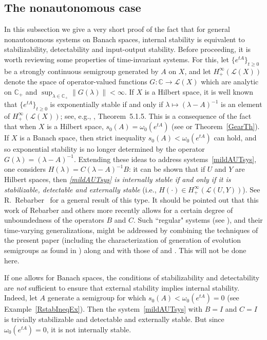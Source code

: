 \documentclass[10pt,psamsfonts,leqno]{siamltex}
\newcommand{\bbC}{\mathbb{C}}
\begin{document}
\subsection{The nonautonomous case} In this subsection we give a very
short
proof of the fact that for general nonautonomous systems on Banach
spaces,
internal stability is equivalent to stabilizability, detectability and
input-output stability.  Before proceeding, it is worth reviewing some
properties of time-invariant systems.  For this, let
$\{e^{tA}\}_{t\ge0}$ be a
strongly continuous semigroup generated by $A$ on $X$, and let
$H_+^\infty(\mathcal{L}(X))$ denote the space of operator-valued
functions $G:\bbC\to\mathcal{L}(X)$ which are analytic on $\bbC_+$ and
$\sup_{\lambda\in\bbC_+}\|G(\lambda)\|<\infty$.    If $X$ is a
Hilbert space, it is well known that $\{e^{tA}\}_{t\ge0}$ is
exponentially stable if and only if $\lambda\mapsto (\lambda-A)^{-1}$ is
an
element of $H_+^\infty(\mathcal{L}(X))$; see, e.g., \cite{CZ},
Theorem~5.1.5.
This is a consequence of the fact that when $X$ is a Hilbert space,
$s_0(A)=\omega_0(e^{tA})$ (see \cite{vanNbook} or
Theorem~\ref{GearTh}).  If
$X$ is a Banach space, then strict inequality $s_0(A)<\omega_0(e^{tA})$
can
hold, and so exponential stability is no longer determined by the
operator $G(\lambda)=(\lambda-A)^{-1}$.  Extending these ideas to
address
systems~\eqref{mildAUTsys}, one considers
$H(\lambda)=C(\lambda-A)^{-1}B$:
it can be shown that if $U$ and $Y$ are Hilbert spaces, then {\em
\eqref{mildAUTsys} is internally stable if and only if it is
stabilizable, detectable and externally stable} (i.e.,
$H(\cdot)\in H_+^\infty(\mathcal{L}(U,Y))$).
See R.~Rebarber~\cite{Reb1} for a general result of this type.
It should be pointed out that
this work of Rebarber and others more recently
allows for a certain degree of
unboundedness of the operators $B$ and $C$.  Such ``regular" systems
(see
\cite{Weiss1}), and their time-varying generalizations, might be
addressed by combining the techniques of the present paper (including
the characterization of generation of evolution semigroups as found in
\cite{RRSV}) along and with those of \cite{HP94} and \cite{JDP}.  This
will not be done here.

If one allows for Banach
spaces, the conditions of stabilizability and detectability
are {\em not} sufficient to ensure that external stability  implies
internal stability.   Indeed, let $A$ generate a semigroup  for which
$s_0(A)<\omega_0(e^{tA})=0$ (see Example~\ref{RstabIneqEx}).  Then  the
system~\eqref{mildAUTsys} with
$B=I$ and $C=I$  is trivially stabilizable and detectable and
externally stable.  But since $\omega_0(e^{tA})=0$, it is not internally
stable.
\end{document}
